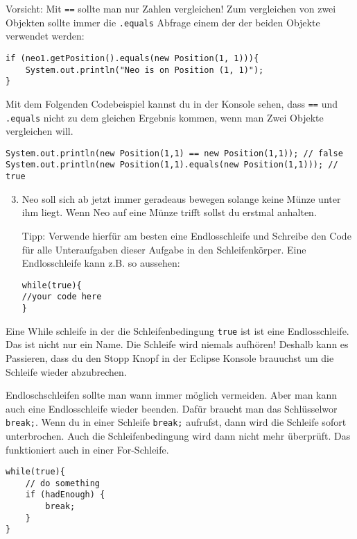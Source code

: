 \begin{Infobox}[\lstinline{==} und \lstinline{.equals()}]
	Vorsicht: Mit \lstinline{==} sollte man nur Zahlen vergleichen! 
	Zum vergleichen von zwei Objekten sollte immer die \lstinline{.equals} Abfrage einem der der beiden Objekte verwendet werden:

	\begin{lstlisting}[numbers=none]
if (neo1.getPosition().equals(new Position(1, 1))){
	System.out.println("Neo is on Position (1, 1)");
}
	\end{lstlisting}

	Mit dem Folgenden Codebeispiel kannst du in der Konsole sehen, dass \lstinline{==} und \lstinline{.equals} nicht zu dem gleichen Ergebnis kommen, wenn man Zwei Objekte vergleichen will.

	\begin{lstlisting}[numbers=none]
System.out.println(new Position(1,1) == new Position(1,1)); // false
System.out.println(new Position(1,1).equals(new Position(1,1))); // true
	\end{lstlisting}

\end{Infobox}


\begin{enumerate}\setcounter{enumi}{2}
	\item
		Neo soll sich ab jetzt immer geradeaus bewegen solange keine Münze unter ihm liegt.
		Wenn Neo auf eine Münze trifft sollst du erstmal anhalten.

		Tipp: Verwende hierfür am besten eine Endlosschleife und Schreibe den Code für alle Unteraufgaben dieser Aufgabe in den Schleifenkörper.
		Eine Endlosschleife kann z.B. so aussehen:
	\begin{lstlisting}
while(true){
//your code here
}
	\end{lstlisting}
\end{enumerate}


\begin{Infobox}
	Eine While schleife in der die Schleifenbedingung \lstinline{true} ist ist eine Endlosschleife.
	Das ist nicht nur ein Name.
	Die Schleife wird niemals aufhören!
	Deshalb kann es Passieren, dass du den Stopp Knopf in der Eclipse Konsole brauuchst um die Schleife wieder abzubrechen.

	Endloschschleifen sollte man wann immer möglich vermeiden.
	Aber man kann auch eine Endlosschleife wieder beenden.
	Dafür braucht man das Schlüsselwor \lstinline{break;}.
	Wenn du in einer Schleife \lstinline{break;} aufrufst, dann wird die Schleife sofort unterbrochen.
	Auch die Schleifenbedingung wird dann nicht mehr überprüft.
	Das funktioniert auch in einer For-Schleife.
	
	\begin{lstlisting}[numbers=none]
while(true){
    // do something
    if (hadEnough) {
        break;
    }
}
	\end{lstlisting}

\end{Infobox}



